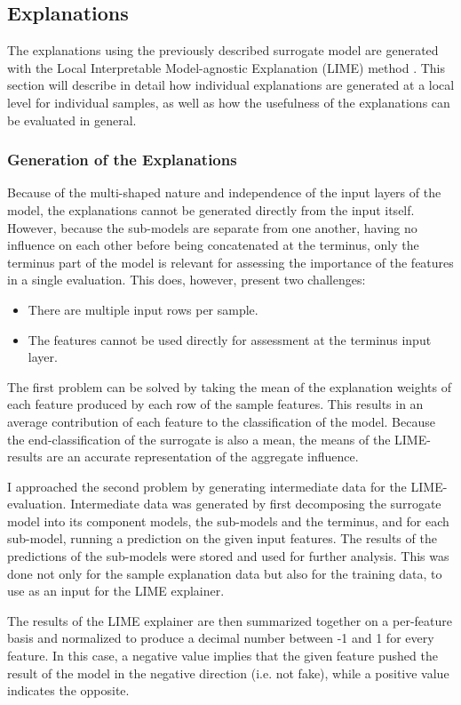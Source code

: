 \documentclass{article}
\begin{document}
		\subsection{Explanations}
		The explanations using the previously described surrogate model are generated with the
		Local Interpretable Model-agnostic Explanation (LIME) method \cite{ribeiro_why_2016}. This
		section will describe in detail how individual explanations are generated at a local level
		for individual samples, as well as how the usefulness of the explanations can be evaluated
		in general.
			\subsubsection{Generation of the Explanations}
			Because of the multi-shaped nature and independence of the input layers of the model,
			the explanations cannot be generated directly from the input itself. However, because
			the sub-models are separate from one another, having no influence on each other before
			being concatenated at the terminus, only the terminus part of the model is relevant
			for assessing the importance of the features in a single evaluation. This does,
			however, present two challenges:
			\begin{itemize}
				\item There are multiple input rows per sample.
				\item The features cannot be used directly for assessment at the terminus input
					layer.
			\end{itemize}
			The first problem can be solved by taking the mean of the explanation weights of each
			feature produced by each row of the sample features. This results in an average
			contribution of each feature to the classification of the model. Because the
			end-classification of the surrogate is also a mean, the means of the LIME-results are
			an accurate representation of the aggregate influence.
			\par
			I approached the second problem by generating intermediate data for the
			LIME-evaluation. Intermediate data was generated by first decomposing the surrogate
			model into its component models, the sub-models and the terminus, and for each
			sub-model, running a prediction on the given input features. The results of the
			predictions of the sub-models were stored and used for further analysis. This was done
			not only for the sample explanation data but also for the training data, to use as an
			input for the LIME explainer.
			\par
			The results of the LIME explainer are then summarized together on a per-feature basis
			and normalized to produce a decimal number between -1 and 1 for every feature. In this
			case, a negative value implies that the given feature pushed the result of the model
			in the negative direction (i.e. not fake), while a positive value indicates the
			opposite.
\end{document}
